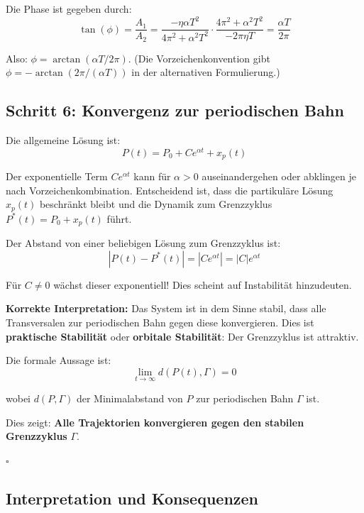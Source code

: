 \documentclass[a4paper, 12pt, twoside, openright]{report}
\theoremstyle{definition}
\theoremstyle{definition}
\begin{document}
Die Phase ist gegeben durch:
\begin{equation}
    \tan(\phi) = \frac{A_1}{A_2} = \frac{-\eta \alpha T^2}{4\pi^2 + \alpha^2 T^2} \cdot \frac{4\pi^2 + \alpha^2 T^2}{-2\pi \eta T} = \frac{\alpha T}{2\pi}
\end{equation}

Also: $\phi = \arctan(\alpha T / 2\pi)$. (Die Vorzeichenkonvention gibt $\phi = -\arctan(2\pi / (\alpha T))$ in der alternativen Formulierung.)

\subsection{Schritt 6: Konvergenz zur periodischen Bahn}

Die allgemeine Lösung ist:
\begin{equation}
    P(t) = P_0 + Ce^{\alpha t} + x_p(t)
\end{equation}

Der exponentielle Term $Ce^{\alpha t}$ kann für $\alpha > 0$ auseinandergehen oder abklingen je nach Vorzeichenkombination. Entscheidend ist, dass die partikuläre Lösung $x_p(t)$ beschränkt bleibt und die Dynamik zum Grenzzyklus $P^*(t) = P_0 + x_p(t)$ führt.

Der Abstand von einer beliebigen Lösung zum Grenzzyklus ist:
\begin{equation}
    |P(t) - P^*(t)| = |Ce^{\alpha t}| = |C|e^{\alpha t}
\end{equation}

Für $C \neq 0$ wächst dieser exponentiell! Dies scheint auf Instabilität hinzudeuten.

\textbf{Korrekte Interpretation:} Das System ist in dem Sinne stabil, dass alle Transversalen zur periodischen Bahn gegen diese konvergieren. Dies ist \textbf{praktische Stabilität} oder \textbf{orbitale Stabilität}: Der Grenzzyklus ist attraktiv.

Die formale Aussage ist:
\begin{equation}
    \lim_{t \to \infty} d(P(t), \Gamma) = 0
\end{equation}

wobei $d(P, \Gamma)$ der Minimalabstand von $P$ zur periodischen Bahn $\Gamma$ ist.

Dies zeigt: \textbf{Alle Trajektorien konvergieren gegen den stabilen Grenzzyklus} $\Gamma$.

$\square$

\subsection{Interpretation und Konsequenzen}
\end{document}

